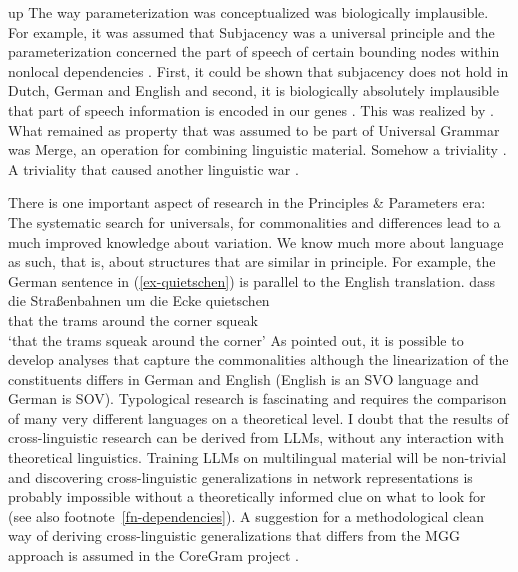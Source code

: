 up 
\iftoggle{long}{%
\parencites{Haider94c-u}[Section~2.2]{Haider2001a}[Section~16.1]{MuellerGT-Eng5}.}{%
\parencites[Section~2.2]{Haider2001a}[Section~16.1]{MuellerGT-Eng5}.}
The way
parameterization was conceptualized was biologically implausible. For example, it was assumed that
Subjacency was a universal principle and the parameterization concerned the part of speech of
certain bounding nodes within nonlocal dependencies \parencites[]{Chomsky73a}[]{Chomsky86b}{Baltin81a,Baltin2006a}. First, it could be shown that subjacency does not hold in
Dutch, German and English \parencites[]{Koster78b-u}[]{Mueller99a}{Mueller2004d}[Section~3]{Mueller2007c}{SS2013b-u} and second, it is biologically
absolutely implausible that part of speech information is encoded in our genes
\parencites{Bishop2002a}[Section~6.4.2.2]{Dabrowska2004a}{FM2005a}. This was realized by
\citet*{HCF2002a}. What remained as property that was assumed to be part of Universal Grammar was
Merge, an operation for combining linguistic material. Somehow a triviality
\citep[475]{MuellerGT-Eng5}. A triviality that caused another linguistic war \citep{Pullum2024a}. 
 
There is one important aspect of research in the Principles \& Parameters era: The systematic search for
universals, for commonalities and differences lead to a much improved knowledge about variation. We
know much more about language as such, that is, about structures that are similar in principle.
For example, the German sentence in (\ref{ex-quietschen}) is parallel to the English translation. 
\ea
\label{ex-quietschen} 
\gll dass die Straßenbahnen um die Ecke quietschen\\
     that the trams         around the corner squeak\\
\glt `that the trams squeak around the corner'
\z
As \citet{MuellerUnifying} pointed out, it is possible to develop analyses that capture the
commonalities although the linearization of the constituents differs in German and English (English
is an SVO language and German is SOV). 
Typological research is fascinating and requires the comparison of many very different languages on a
theoretical level. I doubt that the results of cross-linguistic research can be derived from LLMs,
without any interaction with theoretical linguistics. Training LLMs on multilingual material will be
non-trivial and discovering cross-linguistic generalizations in network representations is probably
impossible without a theoretically informed clue on what to look for (see also footnote~\ref{fn-dependencies}). A suggestion for a
methodological clean way of deriving cross-linguistic generalizations that differs from the MGG
approach is assumed in the CoreGram project \citep{MuellerCoreGram}.


